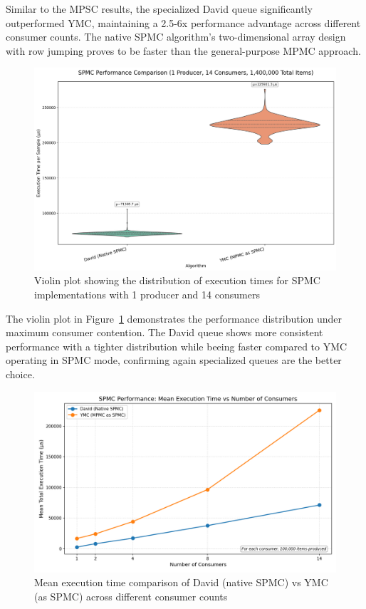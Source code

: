 Similar to the \ac{MPSC} results, the specialized David queue significantly outperformed \ac{YMC}, maintaining a 2.5-6x performance advantage across different consumer counts. The native \ac{SPMC} algorithm's two-dimensional array design with row jumping proves to be faster than the general-purpose \ac{MPMC} approach.

\begin{figure}[htb]
\centering
\caption{Violin plot showing the distribution of execution times for \ac{SPMC} implementations with 1 producer and 14 consumers}
\label{fig:spmc-violin-14c}
\includegraphics[width=\textwidth]{images/results/best_in_spmc_performance_violin_1P14C.png}
\end{figure}

The violin plot in Figure~\ref{fig:spmc-violin-14c} demonstrates the performance distribution under maximum consumer contention. The David queue shows more consistent performance with a tighter distribution while beeing faster compared to \ac{YMC} operating in SPMC mode, confirming again specialized queues are the better choice.

\begin{figure}[htb]
\centering
\caption{Mean execution time comparison of David (native SPMC) vs YMC (as SPMC) across different consumer counts}
\label{fig:cross-spmc-mean}
\includegraphics[width=\textwidth]{images/results/best_in_spmc_mean_performance_vs_consumers.png}
\end{figure}

